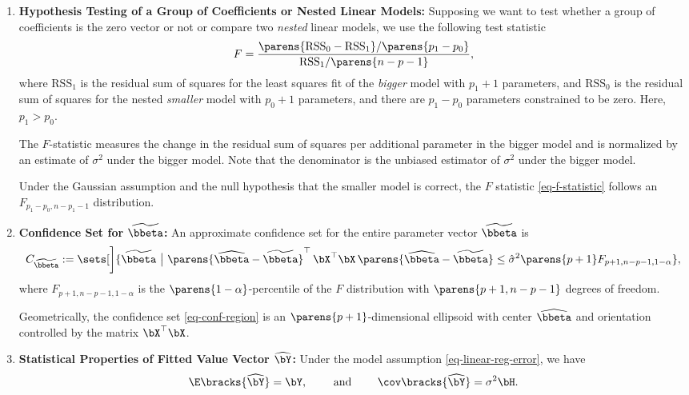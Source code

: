 \documentclass[12pt]{article}
\begin{document}
\begin{enumerate}[label=\textbf{\arabic*.}]
	\item \textbf{Hypothesis Testing of a Group of Coefficients or Nested Linear Models:} Supposing we want to test whether a group of coefficients is the zero vector or not or compare two \emph{nested} linear models, we use the following test statistic 
	\begin{equation}\label{eq-f-statistic}
		F = \frac{\parens{\mathrm{RSS}_0 - \mathrm{RSS}_1} / \parens{p_1 - p_0}}{ \mathrm{RSS}_1 / \parens{n-p-1}}, 
	\end{equation}
	where $\mathrm{RSS}_1$ is the residual sum of squares for the least squares fit of the \emph{bigger} model with $p_1 + 1$ parameters, and $\mathrm{RSS}_0$ is the residual sum of squares for the nested \emph{smaller} model with $p_0 + 1$ parameters, and there are $p_1 - p_0$ parameters constrained to be zero. Here, $p_1 > p_0$. 
	
	The $F$-statistic measures the change in the residual sum of squares per additional parameter in the bigger model and is normalized by an estimate of $\sigma^2$ under the bigger model. Note that the denominator is the unbiased estimator of $\sigma^2$ under the bigger model. 
	
	Under the Gaussian assumption and the null hypothesis that the smaller model is correct, the $F$ statistic \eqref{eq-f-statistic} follows an $F_{p_1-p_0, n-p_1-1}$ distribution. 
	
	\item \textbf{Confidence Set for $\widetilde{\bbeta}$:} An approximate confidence set for the entire parameter vector $\widetilde{\bbeta}$ is 
	\begin{align}\label{eq-conf-region}
		C_{\widetilde{\bbeta}} := \sets[\bigg]{ \widetilde{\bbeta} \,\, \big\vert\,\, \parens{\widehat{\bbeta} - \widetilde{\bbeta}}^\top \, \bX^\top \bX \, \parens{\widehat{\bbeta} - \widetilde{\bbeta}} \le \hat{\sigma}^2 \parens{p+1} F_{p+1, n-p-1, 1-\alpha}}, 
	\end{align}
	where $F_{p+1, n-p-1, 1-\alpha}$ is the $\parens{1 - \alpha}$-percentile of the $F$ distribution with $\parens{p+1, n-p-1}$ degrees of freedom. 
	
	Geometrically, the confidence set \eqref{eq-conf-region} is an $\parens{p + 1}$-dimensional ellipsoid with center $\widehat{\bbeta}$ and orientation controlled by the matrix $\bX^\top \bX$. 
	
	\item \textbf{Statistical Properties of Fitted Value Vector $\widehat{\bY}$:} Under the model assumption \eqref{eq-linear-reg-error}, we have 
	\begin{align*}
		\E \bracks{\widehat{\bY}} = \bY, \qquad \text{ and } \qquad \cov \bracks{\widehat{\bY}} = \sigma^2 \bH. 
	\end{align*}
	

\end{enumerate}
\end{document}
